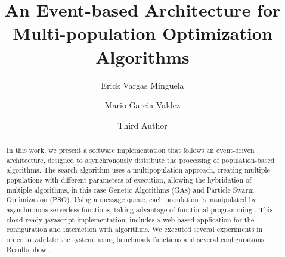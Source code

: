 \documentclass[runningheads]{llncs}
\begin{document}
%
\title{An Event-based Architecture for Multi-population Optimization Algorithms}
%
%
\author{Erick Vargas Minguela \and
Mario Garcia Valdez \and
Third Author}
%
%
%
\maketitle              %
%
\begin{abstract}
    In this work, we present a software implementation that follows an
    event-driven architecture, designed to asynchronously distribute the
    processing of population-based algorithms. The search algorithm uses a
    multipopulation approach, creating multiple populations with different
    parameters of execution, allowing the hybridation of multiple algorithms, in
    this case Genetic Algorithms (GAs) and Particle Swarm Optimization (PSO).
    Using a message queue, each population is manipulated by asynchronous
    serverless functions, taking advantage of functional programming
    . This cloud-ready javascript implementation, includes a web-based application for
    the configuration and interaction with algorithms. We executed several
    experiments in order to validate the system, using benchmark functions and
    several configurations. Results show ...





\end{abstract}
%
%
%
\end{document}
